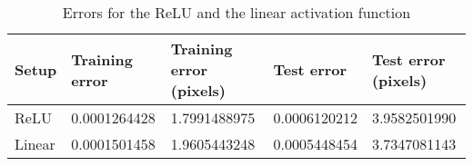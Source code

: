 \begin{table}[h!]
\centering
\footnotesize
\begin{tabular}{|l|l|l|l|l|}
	\hline
		\textbf{Setup} & \textbf{Training error} & \textbf{Training error (pixels)} & \textbf{Test error} & \textbf{Test error (pixels)}\\
	\hline
		ReLU 	& 0.0001264428%
				& 1.7991488975%
				& 0.0006120212%
				& 3.9582501990%
				\\
	\hline
		Linear	& 0.0001501458%
				& 1.9605443248%
				& 0.0005448454%
				& 3.7347081143%
				\\
	\hline
	\end{tabular}
	\normalsize
	\caption{Errors for the ReLU and the linear activation function}
	\label{tab:gabor_errors_relu_vs_linear}
\end{table}
